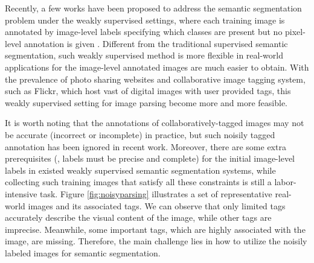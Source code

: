 Recently, a few works have been proposed to address the semantic segmentation problem under the weakly supervised settings, where each training image is annotated by image-level labels specifying which classes are present but no pixel-level annotation is given \cite{verbeek2007region,vezhnevets2010towards,vezhnevets2011weakly,vezhnevets2012weakly,xu2014tell,zhang2013sparse,zhang2013probabilistic}. Different from the traditional supervised semantic segmentation, such weakly supervised method is more flexible in real-world applications for the image-level annotated images are much easier to obtain. With the prevalence of photo sharing websites and collaborative image tagging system, such as Flickr, which host vast of digital images with user provided tags, this weakly supervised setting for image parsing become more and more feasible.




It is worth noting that the annotations of collaboratively-tagged images may not be accurate (incorrect or incomplete) in practice, but such noisily tagged annotation has been ignored in recent work. Moreover, there are some extra prerequisites (\eg, labels must be precise and complete) for the initial image-level labels in existed weakly supervised semantic segmentation systems, while collecting such training images that satisfy all these constraints is still a labor-intensive task. Figure \ref{fig:noisyparsing} illustrates a set of representative real-world images and its associated tags. We can observe that only limited tags accurately describe the visual content of the image, while other tags are imprecise. Meanwhile, some important tags, which are highly associated with the image, are missing. Therefore, the main challenge lies in how to utilize the noisily labeled images for semantic segmentation.
\fi
